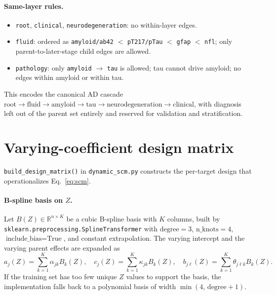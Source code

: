 \documentclass[11pt]{article}
\newcommand{\code}[1]{\texttt{#1}}
\begin{document}
\paragraph{Same-layer rules.}
\begin{itemize}[leftmargin=*,nosep]
  \item \code{root}, \code{clinical}, \code{neurodegeneration}: no within-layer edges.
  \item \code{fluid}: ordered as \code{amyloid/ab42} $<$ \code{pT217/pTau} $<$ \code{gfap} $<$ \code{nfl}; only parent-to-later-stage child edges are allowed.
  \item \code{pathology}: only \code{amyloid} $\to$ \code{tau} is allowed; tau cannot drive amyloid; no edges within amyloid or within tau.
\end{itemize}
This encodes the canonical AD cascade
$\text{root} \to \text{fluid} \to \text{amyloid} \to \text{tau} \to \text{neurodegeneration} \to \text{clinical}$,
with diagnosis left out of the parent set entirely and reserved for
validation and stratification.

\section{Varying-coefficient design matrix}

\code{build\_design\_matrix()} in \code{dynamic\_scm.py} constructs the
per-target design that operationalizes Eq.~\eqref{eq:scm}.

\paragraph{B-spline basis on $Z$.} Let $B(Z) \in \mathbb{R}^{n \times K}$
be a cubic B-spline basis with $K$ columns, built by
\code{sklearn.preprocessing.SplineTransformer} with $\text{degree}=3$,
$\text{n\_knots}=4$, $\text{include\_bias}=\text{True}$, and constant
extrapolation. The varying intercept and the varying parent effects are
expanded as
\begin{equation}
a_j(Z) = \sum_{k=1}^{K} \alpha_{jk} B_k(Z), \quad
c_j(Z) = \sum_{k=1}^{K} \kappa_{jk} B_k(Z), \quad
b_{j\ell}(Z) = \sum_{k=1}^{K} \theta_{j\ell k} B_k(Z).
\label{eq:basis}
\end{equation}
If the training set has too few unique $Z$ values to support the basis, the
implementation falls back to a polynomial basis of width
$\min(4,\,\text{degree}+1)$.
\end{document}
